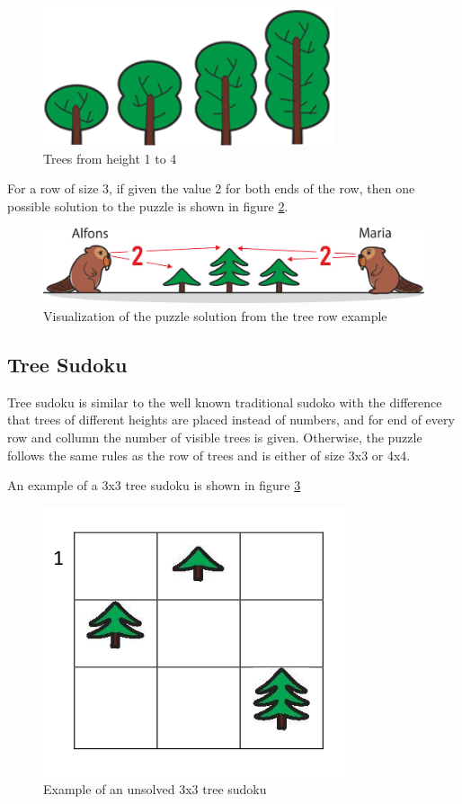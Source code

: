 \begin{figure} 
    \centering
    \includegraphics[width=0.4 \columnwidth]{figures/trees_4.png}
    \caption{Trees from height 1 to 4} 
    \label{fig:trees_4} 
\end{figure}

\begin{example}
    For a row of size 3, if given the value 2 for both ends of the row, then one possible solution to the puzzle is shown in figure \ref{fig:tree_row_example}.
\end{example}

\begin{figure} 
    \centering
    \includegraphics[width=0.8 \columnwidth]{figures/tree_row_example.png}
    \caption{Visualization of the puzzle solution from the tree row example} 
    \label{fig:tree_row_example} 
\end{figure}

\subsection{Tree Sudoku}

Tree sudoku is similar to the well known traditional sudoko with the difference that trees of different heights are placed instead of numbers, and for end of every row and collumn the number of visible trees is given. Otherwise, the puzzle follows the same rules as the row of trees and is either of size 3x3 or 4x4.

\begin{example}
    An example of a 3x3 tree sudoku is shown in figure \ref{fig:tree_sudoku_example}
\end{example}

\begin{figure} 
    \centering
    \includegraphics[width=0.4 \columnwidth]{figures/tree_sudoku_example.png}
    \caption{Example of an unsolved 3x3 tree sudoku} 
    \label{fig:tree_sudoku_example} 
\end{figure}
